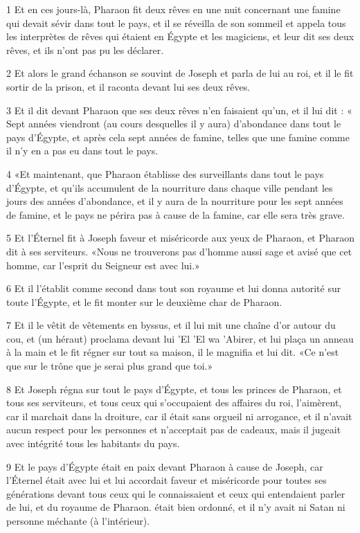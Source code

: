 \par 1 Et en ces jours-là, Pharaon fit deux rêves en une nuit concernant une famine qui devait sévir dans tout le pays, et il se réveilla de son sommeil et appela tous les interprètes de rêves qui étaient en Égypte et les magiciens, et leur dit ses deux rêves, et ils n'ont pas pu les déclarer.
\par 2 Et alors le grand échanson se souvint de Joseph et parla de lui au roi, et il le fit sortir de la prison, et il raconta devant lui ses deux rêves.
\par 3 Et il dit devant Pharaon que ses deux rêves n'en faisaient qu'un, et il lui dit : « Sept années viendront (au cours desquelles il y aura) d'abondance dans tout le pays d'Égypte, et après cela sept années de famine, telles que une famine comme il n'y en a pas eu dans tout le pays.
\par 4 «Et maintenant, que Pharaon établisse des surveillants dans tout le pays d'Égypte, et qu'ils accumulent de la nourriture dans chaque ville pendant les jours des années d'abondance, et il y aura de la nourriture pour les sept années de famine, et le pays ne périra pas à cause de la famine, car elle sera très grave.
\par 5 Et l'Éternel fit à Joseph faveur et miséricorde aux yeux de Pharaon, et Pharaon dit à ses serviteurs. «Nous ne trouverons pas d'homme aussi sage et avisé que cet homme, car l'esprit du Seigneur est avec lui.»
\par 6 Et il l'établit comme second dans tout son royaume et lui donna autorité sur toute l'Égypte, et le fit monter sur le deuxième char de Pharaon.
\par 7 Et il le vêtit de vêtements en byssus, et il lui mit une chaîne d'or autour du cou, et (un héraut) proclama devant lui 'El 'El wa 'Abirer, et lui plaça un anneau à la main et le fit régner sur tout sa maison, il le magnifia et lui dit. «Ce n'est que sur le trône que je serai plus grand que toi.»
\par 8 Et Joseph régna sur tout le pays d'Égypte, et tous les princes de Pharaon, et tous ses serviteurs, et tous ceux qui s'occupaient des affaires du roi, l'aimèrent, car il marchait dans la droiture, car il était sans orgueil ni arrogance, et il n'avait aucun respect pour les personnes et n'acceptait pas de cadeaux, mais il jugeait avec intégrité tous les habitants du pays.
\par 9 Et le pays d'Égypte était en paix devant Pharaon à cause de Joseph, car l'Éternel était avec lui et lui accordait faveur et miséricorde pour toutes ses générations devant tous ceux qui le connaissaient et ceux qui entendaient parler de lui, et du royaume de Pharaon. était bien ordonné, et il n'y avait ni Satan ni personne méchante (à l'intérieur).
